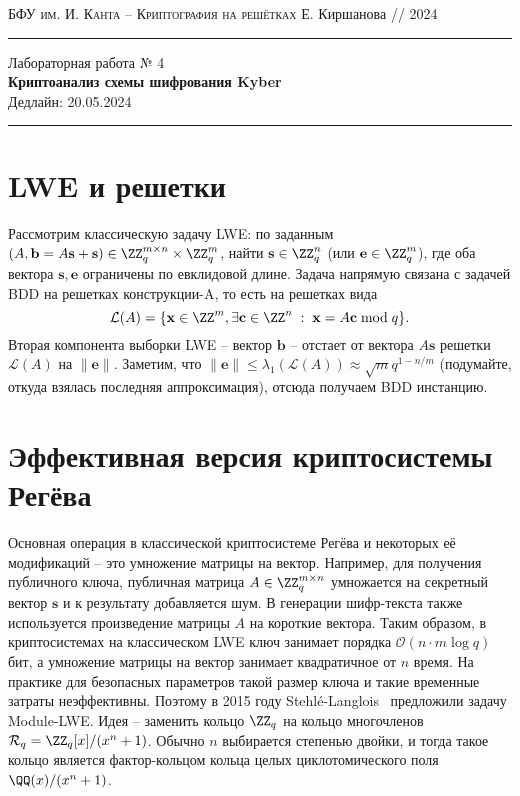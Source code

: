 \documentclass[11pt]{exam}
\theoremstyle{definition}
\let\vec\mathbf
\begin{document}
	{\noindent
		\textsc{БФУ им. И. Канта -- Криптография на решётках}
		\hfill {Е. Киршанова // 2024}
\hrule
\begin{center}
	{\LARGE
			Лабораторная работа № 4 \\[5pt]
			\textbf{
			Криптоанализ схемы шифрования Kyber
				} \\[10pt]
	 	{Дедлайн: 20.05.2024} 
 	} 
\end{center}
\hrule \vspace{5mm}
	
	\thispagestyle{empty}
	
	\vspace{0.2cm}
	
	\section{LWE и решетки}
	
	Рассмотрим классическую задачу LWE: по заданным $(A, \vec b = A\vec s + \vec s) \in \ZZ_q^{m \times n} \times \ZZ_q^m$, найти $\vec s \in \ZZ_q^n$ (или $\vec e \in \ZZ_q^m$), где оба вектора $\vec s, \vec e$ ограничены по евклидовой длине. Задача напрямую связана с задачей BDD на решетках конструкции-A, то есть на решетках вида 
	\[\mathcal{L}(A) = \{ \vec x \in \ZZ^m, \exists   \vec c \in \ZZ^n  \; : \; \vec x = A \vec c \bmod q \}.\] 
	Вторая компонента выборки LWE -- вектор $\vec b$ -- отстает от вектора $A \vec s$ решетки $\mathcal{L}(A)$ на $\| \vec e\|$. Заметим, что $\| \vec e\| \le \lambda_1(\mathcal{L}(A) ) \approx \sqrt{m}q^{1-n/m}$ (подумайте, откуда взялась последняя аппроксимация), отсюда получаем BDD инстанцию.
	
	\section{Эффективная версия криптосистемы Регёва}
	Основная операция в классической криптосистеме Регёва и некоторых её модификаций -- это умножение матрицы на вектор. Например, для получения публичного ключа, публичная матрица $A \in \ZZ_q^{m\times n}$ умножается на секретный вектор $\vec s$ и к результату добавляется шум. В генерации шифр-текста также используется произведение матрицы $A$ на короткие вектора.  Таким образом, в криптосистемах на классическом LWE ключ занимает порядка $\mathcal{O}(n\cdot m \log q)$ бит, а умножение матрицы на вектор занимает квадратичное от $n$ время. На практике для безопасных параметров такой размер ключа и такие временные затраты неэффективны. Поэтому в 2015 году Stehl\'e-Langlois~\cite{LS} предложили задачу Module-LWE. Идея -- заменить кольцо $\ZZ_q$ на кольцо многочленов $\mathcal{R}_q = \ZZ_q[x]/(x^n+1)$. Обычно $n$ выбирается степенью двойки, и тогда такое кольцо является фактор-кольцом кольца целых циклотомического поля $\QQ(x)/(x^n+1)$. 
	
}
\end{document}
